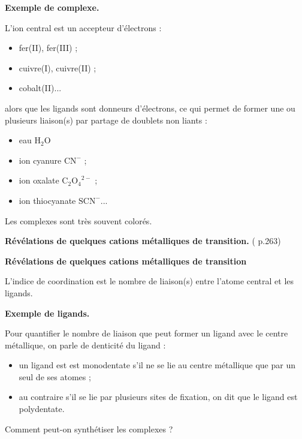 \begin{slide}
\textbf{Exemple de complexe.}
\end{slide}

L'ion central est un accepteur d'électrons :
\begin{itemize}
\item fer(II), fer(III) ;
\item cuivre(I), cuivre(II) ;
\item cobalt(II)...
\end{itemize}
alors que les ligands sont donneurs d'électrons, ce qui permet de former une ou plusieurs liaison(s) par partage de doublets non liants :
\begin{itemize}
\item eau $\mathrm{H_2O}$
\item ion cyanure $\mathrm{CN}^-$ ;
\item ion oxalate $\mathrm{C_2O_4}^{2-}$ ;
\item ion thiocyanate $\mathrm{SCN^-}$...
\end{itemize}
Les complexes sont très souvent colorés.

\begin{experience}
\textbf{Révélations de quelques cations métalliques de transition.}
(\cite{Buchere2017} p.263)
\end{experience}

\begin{slide}
\textbf{Révélations de quelques cations métalliques de transition}
\end{slide}

L'indice de coordination est le nombre de liaison(s) entre l'atome central et les ligands.

\begin{slide}
\textbf{Exemple de ligands.}
\end{slide}

Pour quantifier le nombre de liaison que peut former un ligand avec le centre métallique, on parle de denticité du ligand :
\begin{itemize}
\item un ligand est est monodentate s'il ne se lie au centre métallique que par un seul de ses atomes ;
\item au contraire s'il se lie par plusieurs sites de fixation, on dit que le ligand est polydentate.
\end{itemize}

\begin{transition}
Comment peut-on synthétiser les complexes ?
\end{transition}

